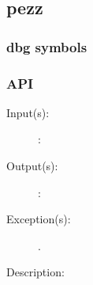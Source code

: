 %
%
%
%
%              

\subsection{pezz}
\label{pezz}

\subsubsection{dbg symbols}

\subsubsection{API}
\begin{description}
\label{pezz_}
\item[{\cfunc[]{pezz\_}{}}: ]
	\begin{description}\item[]
	\item[Input(s): ]
		\begin{description}\item[]
		\item[: ]
		\end{description}
	\item[Output(s): ]
		\begin{description}\item[]
		\item[: ]
		\end{description}
	\item[Exception(s): ]
		\begin{description}\item[]
		\item[.]
		\end{description}
	\item[Description: ]
	\end{description}
\end{description}
